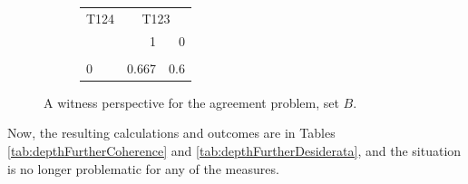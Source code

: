 \documentclass[
  10pt,
]{scrartcl}
\begin{document}
\begin{figure}[H]
\begin{subfigure}[!ht]{0.6\textwidth}
\begin{tabular}{lrr}
\toprule
\multicolumn{1}{c}{T124} & \multicolumn{2}{c}{T123} \\
  & 1 & 0\\
\midrule
\cellcolor{gray!6}{1} & \cellcolor{gray!6}{0.333} & \cellcolor{gray!6}{0.4}\\
0 & 0.667 & 0.6\\
\bottomrule
\end{tabular}
\endgroup{}
\end{subfigure}
\caption{A witness perspective for the \textsf{agreement} problem, set $B$.}
\end{figure}

\noindent Now, the resulting calculations and outcomes are in Tables \ref{tab:depthFurtherCoherence} and \ref{tab:depthFurtherDesiderata}, and the situation is no longer problematic for any of the measures.

\begin{table}[H]

\caption{\label{tab:depthFurtherCoherence}Coherence scores in a single agent version of the Depth scenario (rounded).}
\centering
{}
\end{table}

\begin{table}[H]

\caption{\label{tab:depthFurtherDesiderata}Desideratum satisfaction in the single agent version of the Depth scenario.}
\centering
{}
\end{table}
\end{document}
